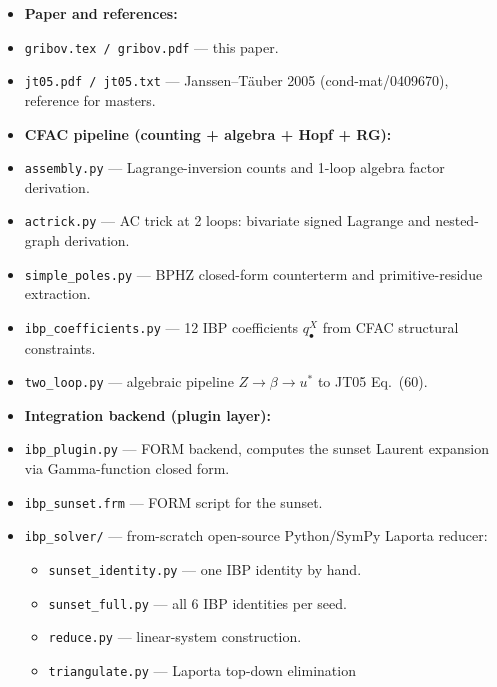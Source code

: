 \documentclass[11pt,a4paper]{article}
\theoremstyle{definition}
\theoremstyle{plain}
\begin{document}
\begin{cfacbox}
\begin{itemize}[leftmargin=2em,itemsep=2pt]
  \item[] \textbf{Paper and references:}
  \item \texttt{gribov.tex / gribov.pdf} --- this paper.
  \item \texttt{jt05.pdf / jt05.txt} --- Janssen--T\"auber 2005
    (cond-mat/0409670), reference for masters.
\end{itemize}
\begin{itemize}[leftmargin=2em,itemsep=2pt]
  \item[] \textbf{CFAC pipeline (counting + algebra + Hopf + RG):}
  \item \texttt{assembly.py} --- Lagrange-inversion counts and
    1-loop algebra factor derivation.
  \item \texttt{actrick.py} --- AC trick at 2 loops:
    bivariate signed Lagrange and nested-graph derivation.
  \item \texttt{simple\_poles.py} --- BPHZ closed-form
    counterterm and primitive-residue extraction.
  \item \texttt{ibp\_coefficients.py} --- 12 IBP coefficients
    $q^X_\bullet$ from CFAC structural constraints.
  \item \texttt{two\_loop.py} --- algebraic pipeline
    $Z \to \beta \to u^*$ to JT05 Eq.~(60).
\end{itemize}
\begin{itemize}[leftmargin=2em,itemsep=2pt]
  \item[] \textbf{Integration backend (plugin layer):}
  \item \texttt{ibp\_plugin.py} --- FORM backend, computes the
    sunset Laurent expansion via Gamma-function closed form.
  \item \texttt{ibp\_sunset.frm} --- FORM script for the sunset.
  \item \texttt{ibp\_solver/} --- from-scratch open-source Python/SymPy
    Laporta reducer:
    \begin{itemize}[leftmargin=1em,itemsep=1pt]
      \item \texttt{sunset\_identity.py} --- one IBP identity by hand.
      \item \texttt{sunset\_full.py} --- all 6 IBP identities per seed.
      \item \texttt{reduce.py} --- linear-system construction.
      \item \texttt{triangulate.py} --- Laporta top-down elimination

\end{itemize}
\end{itemize}
\end{cfacbox}
\end{document}
